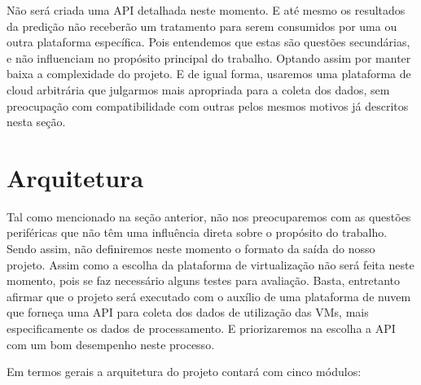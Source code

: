 \documentclass[twoside,english,brazilian]{UNISINOSmonografia}
\begin{document}
Não será criada uma API detalhada neste momento. E até mesmo os resultados da predição não receberão um tratamento para serem consumidos por uma ou outra plataforma específica. Pois entendemos que estas são questões secundárias, e não influenciam no propósito principal do trabalho. Optando assim por manter baixa a complexidade do projeto. E de igual forma, usaremos uma plataforma de cloud arbitrária que julgarmos mais apropriada para a coleta dos dados, sem preocupação com compatibilidade com outras pelos mesmos motivos já descritos nesta seção.

\section{Arquitetura}

Tal como mencionado na seção anterior, não nos preocuparemos com as questões periféricas que não têm uma influência direta sobre o propósito do trabalho. Sendo assim, não definiremos neste momento o formato da saída do nosso projeto. Assim como a escolha da plataforma de virtualização não será feita neste momento, pois se faz necessário alguns testes para avaliação. Basta, entretanto afirmar que o projeto será executado com o auxílio de uma plataforma de nuvem que forneça uma API para coleta dos dados de utilização das VMs, mais especificamente os dados de processamento. E priorizaremos na escolha a API com um bom desempenho neste processo.

Em termos gerais a arquitetura do projeto contará com cinco módulos:
\end{document}
